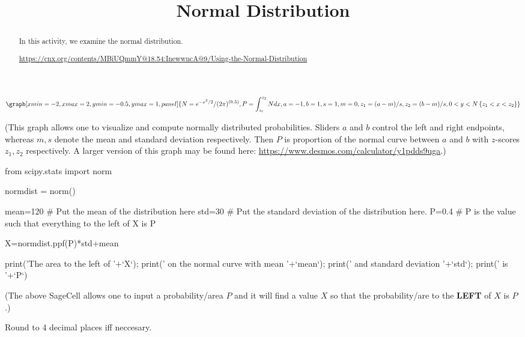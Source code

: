 \documentclass{ximera}
\title{Normal Distribution}
\begin{document}
      
\begin{abstract}
      
In this activity, we examine the normal distribution.

\url{https://cnx.org/contents/MBiUQmmY@18.54:InewwncA@9/Using-the-Normal-Distribution}

      
\end{abstract}
      
\maketitle
 

\begin{onlineOnly}
$$\graph[xmin=-2,xmax=2,ymin=-0.5,ymax=1, panel]{N=e^{-x^2/2}/(2\pi)^{(0.5)}, P=\int_{z_1}^{z_2} N dx, a=-1, b=1, s=1, m=0, z_1=(a-m)/s, z_2=(b-m)/s, 0<y<N\left\{z_1<x<z_2\right\}}$$
\end{onlineOnly}
(This graph allows one to visualize and compute normally distributed probabilities.  Sliders $a$ and $b$ control the left and right endpoints, whereas $m, s$ denote the mean and standard deviation respectively.  Then $P$ is proportion of the normal curve between $a$ and $b$ with $z$-scores $z_1, z_2$ respectively.  A larger version of this graph may be found here: \url{https://www.desmos.com/calculator/y1pdds9uga}.)


\begin{sageCell}
from scipy.stats import norm

normdist = norm()

mean=120 # Put the mean of the distribution here
std=30  # Put the standard deviation of the distribution here.
P=0.4  # P is the value such that everything to the left of X is P

X=normdist.ppf(P)*std+mean

print('The area to the left of '+`X`); print(' on the normal curve with mean '+`mean`); print(' and standard deviation '+`std`); print(' is  '+`P`)
\end{sageCell}
(The above SageCell allows one to input a probability/area $P$ and it will find a value $X$ so that the probability/are to the \textbf{LEFT} of $X$ is $P$.)


Round to 4 decimal places iff neccesary.
\end{document}
